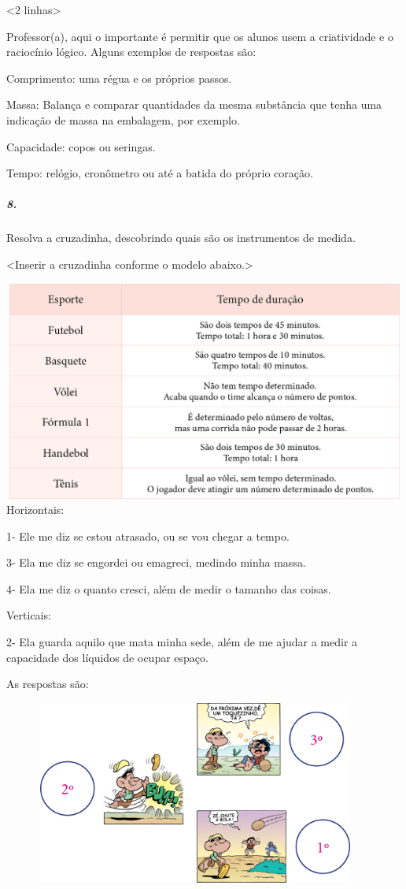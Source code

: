\textless{}2 linhas\textgreater{}

Professor(a), aqui o importante é permitir que os alunos usem a
criatividade e o raciocínio lógico. Alguns exemplos de respostas são:

Comprimento: uma régua e os próprios passos.

Massa: Balança e comparar quantidades da mesma substância que tenha uma
indicação de massa na embalagem, por exemplo.

Capacidade: copos ou seringas.

Tempo: relógio, cronômetro ou até a batida do próprio coração.

\subparagraph{8.}\label{section-35}

Resolva a cruzadinha, descobrindo quais são os instrumentos de medida.

\textless{}Inserir a cruzadinha conforme o modelo abaixo.\textgreater{}

\includegraphics[width=6.14865in,height=2.84375in]{media/image48.png}Horizontais:

1- Ele me diz se estou atrasado, ou se vou chegar a tempo.

3- Ela me diz se engordei ou emagreci, medindo minha massa.

4- Ela me diz o quanto cresci, além de medir o tamanho das coisas.

Verticais:

2- Ela guarda aquilo que mata minha sede, além de me ajudar a medir a
capacidade dos líquidos de ocupar espaço.

As respostas são:

\includegraphics[width=5.00000in,height=2.37500in]{media/image49.png}

